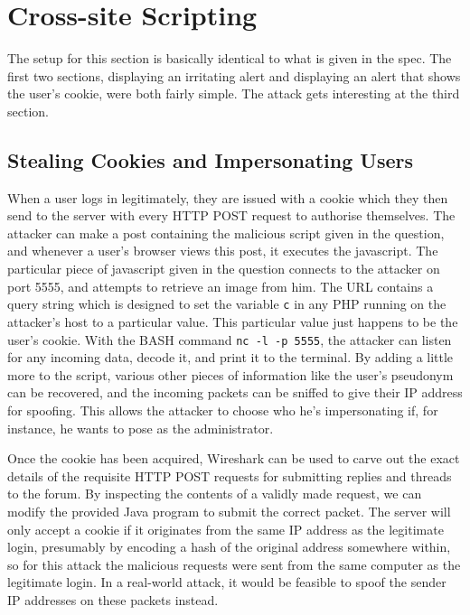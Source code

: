 \section{Cross-site Scripting}

The setup for this section is basically identical to what is given in the spec. The first two sections, displaying an
irritating alert and displaying an alert that shows the user's cookie, were both fairly simple. The attack gets
interesting at the third section.

\subsection{Stealing Cookies and Impersonating Users}

When a user logs in legitimately, they are issued with a cookie which they then send to the server with every HTTP POST
request to authorise themselves. The attacker can make a post containing the malicious script given in the question, and
whenever a user's browser views this post, it executes the javascript. The particular piece of javascript given in the
question connects to the attacker on port 5555, and attempts to retrieve an image from him. The URL contains a query
string which is designed to set the variable {\tt c} in any PHP running on the attacker's host to a particular value.
This particular value just happens to be the user's cookie. With the BASH command {\tt nc -l -p 5555}, the attacker can
listen for any incoming data, decode it, and print it to the terminal. By adding a little more to the script, various
other pieces of information like the user's pseudonym can be recovered, and the incoming packets can be sniffed to give
their IP address for spoofing. This allows the attacker to choose who he's impersonating if, for instance, he wants to
pose as the administrator.

Once the cookie has been acquired, Wireshark can be used to carve out the exact details of the requisite HTTP POST
requests for submitting replies and threads to the forum. By inspecting the contents of a validly made request, we can
modify the provided Java program to submit the correct packet. The server will only accept a cookie if it originates
from the same IP address as the legitimate login, presumably by encoding a hash of the original address somewhere
within, so for this attack the malicious requests were sent from the same computer as the legitimate login. In a
real-world attack, it would be feasible to spoof the sender IP addresses on these packets instead.

